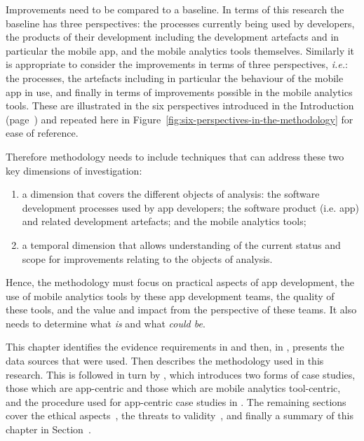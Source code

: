 Improvements need to be compared to a baseline. In terms of this research the baseline has three perspectives: the processes currently being used by developers, the products of their development including the development artefacts and in particular the mobile app, and the mobile analytics tools themselves. Similarly it is appropriate to consider the improvements in terms of three perspectives, \textit{i.e.}: the processes, the artefacts including in particular the behaviour of the mobile app in use, and finally in terms of improvements possible in the mobile analytics tools. These are illustrated in the six perspectives introduced in the Introduction (page~\pageref{rq-leads-to-six-perspectives}) and repeated here in Figure~\ref{fig:six-perspectives-in-the-methodology} for ease of reference.

Therefore methodology needs to include techniques that can address these two key dimensions of investigation:
\begin{enumerate}
    \item a dimension that covers the different objects of analysis: the software development processes used by app developers; the software product (i.e. app) and related development artefacts; and the mobile analytics tools; 
    
    \item a temporal dimension that allows understanding of the current status and scope for improvements relating to the objects of analysis.
\end{enumerate}

Hence, the methodology must 
focus on practical aspects of app development, the use of mobile analytics tools by these app development teams, the quality of these tools, and the value and impact from the perspective of these teams. It also needs to determine what \emph{is} and what \emph{could be}.

\medskip

This chapter identifies the evidence requirements in  and then, in , presents the data sources that were used.  Then  describes the methodology used in this research. This is followed in turn by , which introduces two forms of case studies, those which are app-centric and those which are mobile analytics tool-centric, and the procedure used for app-centric case studies in . The remaining sections cover the ethical aspects~, the threats to validity~, and finally a summary of this chapter in Section~. 

